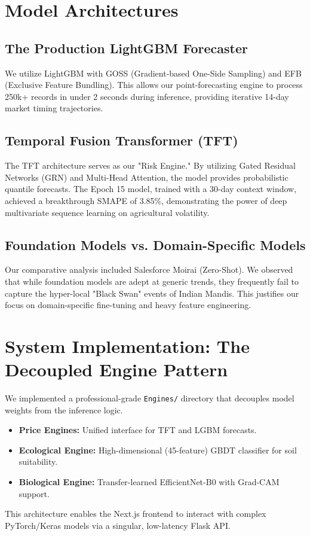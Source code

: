 \documentclass[conference]{IEEEtran}
\begin{document}
\section{Model Architectures}

\subsection{The Production LightGBM Forecaster}
We utilize LightGBM with GOSS (Gradient-based One-Side Sampling) and EFB (Exclusive Feature Bundling). This allows our point-forecasting engine to process 250k+ records in under 2 seconds during inference, providing iterative 14-day market timing trajectories.

\subsection{Temporal Fusion Transformer (TFT)}
The TFT architecture serves as our "Risk Engine." By utilizing Gated Residual Networks (GRN) and Multi-Head Attention, the model provides probabilistic quantile forecasts. The Epoch 15 model, trained with a 30-day context window, achieved a breakthrough SMAPE of 3.85\%, demonstrating the power of deep multivariate sequence learning on agricultural volatility.

\subsection{Foundation Models vs. Domain-Specific Models}
Our comparative analysis included Salesforce Moirai (Zero-Shot). We observed that while foundation models are adept at generic trends, they frequently fail to capture the hyper-local "Black Swan" events of Indian Mandis. This justifies our focus on domain-specific fine-tuning and heavy feature engineering.

\section{System Implementation: The Decoupled Engine Pattern}
We implemented a professional-grade \texttt{Engines/} directory that decouples model weights from the inference logic.
\begin{itemize}
    \item \textbf{Price Engines:} Unified interface for TFT and LGBM forecasts.
    \item \textbf{Ecological Engine:} High-dimensional (45-feature) GBDT classifier for soil suitability.
    \item \textbf{Biological Engine:} Transfer-learned EfficientNet-B0 with Grad-CAM support.
\end{itemize}
This architecture enables the Next.js frontend to interact with complex PyTorch/Keras models via a singular, low-latency Flask API.
\end{document}
